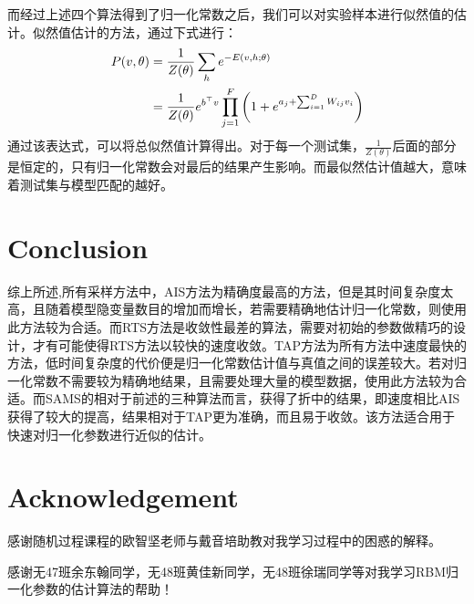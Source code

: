 \documentclass[journal,a4paper]{IEEEtran}
\begin{document}
		而经过上述四个算法得到了归一化常数之后，我们可以对实验样本进行似然值的估计。似然值估计的方法，通过下式进行：
		\begin{align}
		P(v,\theta) & = \frac{1}{Z(\theta)}\sum_h e^{-E(v,h;\theta)} \notag \\
		& = \frac{1}{Z(\theta)} e^{b^{\top}v} \prod_{j=1}^F \left(1+e^{a_j+\sum_{i=1}^{D}W_{ij}v_i}\right)
		\end{align}
		通过该表达式，可以将总似然值计算得出。对于每一个测试集，$\frac{1}{Z(\theta)}$后面的部分是恒定的，只有归一化常数会对最后的结果产生影响。而最似然估计值越大，意味着测试集与模型匹配的越好。
		
	\section{Conclusion}
		综上所述,所有采样方法中，AIS方法为精确度最高的方法，但是其时间复杂度太高，且随着模型隐变量数目的增加而增长，若需要精确地估计归一化常数，则使用此方法较为合适。而RTS方法是收敛性最差的算法，需要对初始的参数做精巧的设计，才有可能使得RTS方法以较快的速度收敛。TAP方法为所有方法中速度最快的方法，低时间复杂度的代价便是归一化常数估计值与真值之间的误差较大。若对归一化常数不需要较为精确地结果，且需要处理大量的模型数据，使用此方法较为合适。而SAMS的相对于前述的三种算法而言，获得了折中的结果，即速度相比AIS获得了较大的提高，结果相对于TAP更为准确，而且易于收敛。该方法适合用于快速对归一化参数进行近似的估计。
		
	\section{Acknowledgement}
	感谢随机过程课程的欧智坚老师与戴音培助教对我学习过程中的困惑的解释。

	感谢无47班余东翰同学，无48班黄佳新同学，无48班徐瑞同学等对我学习RBM归一化参数的估计算法的帮助！

	
\end{document}
